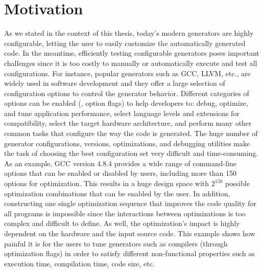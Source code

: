 \section{Motivation}


As we stated in the context of this thesis, today's modern generators are highly configurable, letting the user to easily customize the automatically generated code. In the meantime, efficiently testing configurable generators poses important challenges since it is too costly to manually or automatically execute and test all configurations. 
For instance, popular generators such as GCC, LLVM, etc., are widely used in software development and they
offer a large selection of configuration options to control the generator behavior. 
Different categories of options can be enabled (\ie, option flags) to help developers to: debug, optimize, and tune application performance, select language levels and extensions for compatibility, select the target hardware architecture, and perform many other common tasks that configure the way the code is generated.
The huge number of generator configurations, versions, optimizations, and debugging utilities make the task of choosing the best configuration set very difficult and time-consuming. As an example, GCC version 4.8.4 provides a wide range of command-line options that can be enabled or disabled by users, including more than 150 options for optimization. This results in a huge design space with $2^{150}$ possible optimization combinations that can be enabled by the user. In addition, constructing one single optimization sequence that improves the code quality for all programs is impossible since the interactions between optimizations is too complex and difficult to define. As well, the optimization's impact is highly dependent on the hardware and the input source code.
This example shows how painful it is for the users to tune generators such as compilers (through optimization flags) in order to satisfy different non-functional properties such as execution time, compilation time, code size, etc.

